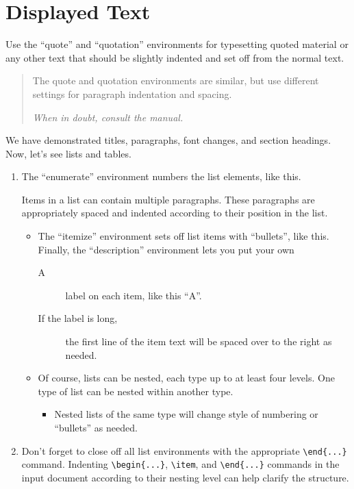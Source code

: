 \documentclass[11pt]{article}
\begin{document}
\section {Displayed Text}
Use the ``quote'' and  ``quotation'' environments for typesetting quoted
material or any other text that should be slightly indented and set off
from the normal text.
\begin{quotation}
The quote and quotation environments are similar, but use different 
settings for paragraph indentation and spacing.

\em When in doubt, consult the manual.
\end{quotation}

We have demonstrated titles, paragraphs, font changes, and
section headings.
Now, let's see lists and tables.
\begin{enumerate}
\item 
The ``enumerate'' environment numbers the list elements, like this.

Items in a list can contain multiple paragraphs.
These paragraphs are appropriately spaced and indented according to their
position in the list.
   \begin{itemize}
   \item The ``itemize'' environment sets off list items with ``bullets'',
like this.  Finally, the ``description'' environment lets you put your own
      \begin{description}
      \item[A] label on each item, like this ``A''.
      \item[If the label is long,] the first line of the item text will
be spaced over to the right as needed.
      \end{description}
   \item Of course, lists can be nested, each type up to at least four levels.
One type of list can be nested within another type.
      \begin{itemize}
      \item Nested lists of the same type will change style of numbering 
or ``bullets'' as needed.
      \end{itemize}
   \end{itemize}
\item Don't forget to close off all list environments with the 
appropriate \verb+\end{...}+ command.
Indenting \verb+\begin{...}+, \verb+\item+, and \verb+\end{...}+
commands in the input document according to their nesting level can help 
clarify the structure.
\end{enumerate}
\end{document}
